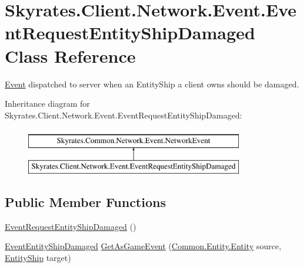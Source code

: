 \hypertarget{class_skyrates_1_1_client_1_1_network_1_1_event_1_1_event_request_entity_ship_damaged}{\section{Skyrates.\-Client.\-Network.\-Event.\-Event\-Request\-Entity\-Ship\-Damaged Class Reference}
\label{class_skyrates_1_1_client_1_1_network_1_1_event_1_1_event_request_entity_ship_damaged}
}


\hyperlink{namespace_skyrates_1_1_client_1_1_network_1_1_event}{Event} dispatched to server when an Entity\-Ship a client owns should be damaged.  


Inheritance diagram for Skyrates.\-Client.\-Network.\-Event.\-Event\-Request\-Entity\-Ship\-Damaged\-:\begin{figure}[H]
\begin{center}
\leavevmode
\includegraphics[height=2.000000cm]{class_skyrates_1_1_client_1_1_network_1_1_event_1_1_event_request_entity_ship_damaged}
\end{center}
\end{figure}
\subsection*{Public Member Functions}
\begin{DoxyCompactItemize}
\item 
\hyperlink{class_skyrates_1_1_client_1_1_network_1_1_event_1_1_event_request_entity_ship_damaged_ac8bdf44986e891de55d88f3b2a5a73b9}{Event\-Request\-Entity\-Ship\-Damaged} ()
\item 
\hyperlink{class_skyrates_1_1_client_1_1_game_1_1_event_1_1_event_entity_ship_damaged}{Event\-Entity\-Ship\-Damaged} \hyperlink{class_skyrates_1_1_client_1_1_network_1_1_event_1_1_event_request_entity_ship_damaged_a20305bfb7f9e9e58479c3dc66701a59b}{Get\-As\-Game\-Event} (\hyperlink{class_skyrates_1_1_common_1_1_entity_1_1_entity}{Common.\-Entity.\-Entity} source, \hyperlink{class_skyrates_1_1_client_1_1_entity_1_1_entity_ship}{Entity\-Ship} target)
\end{DoxyCompactItemize}
